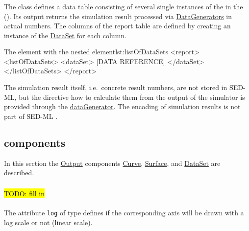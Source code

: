 \subsubsection{}
\label{class:report}
The  class defines a data table consisting of several single instances of the \hyperref[class:dataSet]{} in the  (). Its output returns the simulation result processed via \hyperref[class:dataGenerator]{DataGenerators} in actual numbers. The columns of the report table are defined by creating an instance of the \hyperref[class:dataSet]{DataSet} for each column. 


\begin{myXmlLst}{The  element with the nested  element}{lst:listOfDataSets}
<report>
	<listOfDataSets>
		<dataSet>
			[DATA REFERENCE]
		</dataSet>
	</listOfDataSets>
</report>
\end{myXmlLst}

The simulation result itself, i.e.\ concrete result numbers, are not stored in SED-ML, but the directive how to calculate them from the output of the simulator is provided through the \hyperref[class:dataGenerator]{dataGenerator}. The encoding of simulation results is not part of SED-ML \currentLV.

\subsection{ components}
In this section the \hyperref[class:output]{Output} components \hyperref[class:curve]{Curve}, \hyperref[class:surface]{Surface}, and \hyperref[class:dataSet]{DataSet} are described.


\subsubsection{}
\label{class:axis}
\hl{TODO: fill in}

\paragraph*{}
The attribute {\tt log} of type  defines if the corresponding axis will be drawn with a log scale or not (linear scale).

